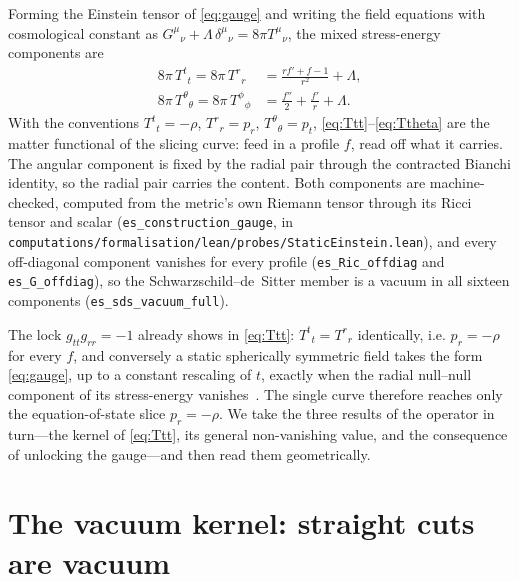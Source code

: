 \documentclass[11pt,a4paper]{article}
\theoremstyle{definition}
\newcommand{\Tud}[2]{T^{#1}{}_{#2}}
\begin{document}
Forming the Einstein tensor of \eqref{eq:gauge} and writing the field equations with cosmological constant as $G^{\mu}{}_{\nu}+\Lambda\,\delta^{\mu}{}_{\nu}=8\pi \Tud{\mu}{\nu}$, the mixed stress-energy components are
\begin{align}
8\pi\,\Tud{t}{t}=8\pi\,\Tud{r}{r}&=\frac{r f'+f-1}{r^{2}}+\Lambda,\label{eq:Ttt}\\
8\pi\,\Tud{\theta}{\theta}=8\pi\,\Tud{\phi}{\phi}&=\frac{f''}{2}+\frac{f'}{r}+\Lambda.\label{eq:Ttheta}
\end{align}
With the conventions $\Tud{t}{t}=-\rho$, $\Tud{r}{r}=p_{r}$, $\Tud{\theta}{\theta}=p_{t}$, \eqref{eq:Ttt}--\eqref{eq:Ttheta} are the matter functional of the slicing curve: feed in a profile $f$, read off what it carries. The angular component is fixed by the radial pair through the contracted Bianchi identity, so the radial pair carries the content. Both components are machine-checked, computed from the metric's own Riemann tensor through its Ricci tensor and scalar (\texttt{es\_construction\_gauge}, in \texttt{computations/formalisation/lean/probes/StaticEinstein.lean}), and every off-diagonal component vanishes for every profile (\texttt{es\_Ric\_offdiag} and \texttt{es\_G\_offdiag}), so the Schwarzschild--de~Sitter member is a vacuum in all sixteen components (\texttt{es\_sds\_vacuum\_full}).

The lock $g_{tt}g_{rr}=-1$ already shows in \eqref{eq:Ttt}: $\Tud{t}{t}=\Tud{r}{r}$ identically, i.e. $p_{r}=-\rho$ for every $f$, and conversely a static spherically symmetric field takes the form \eqref{eq:gauge}, up to a constant rescaling of $t$, exactly when the radial null--null component of its stress-energy vanishes~\cite{Jacobson2007}. The single curve therefore reaches only the equation-of-state slice $p_{r}=-\rho$. We take the three results of the operator in turn---the kernel of \eqref{eq:Ttt}, its general non-vanishing value, and the consequence of unlocking the gauge---and then read them geometrically.

\section{The vacuum kernel: straight cuts are vacuum}\label{sec:kernel}
\end{document}
